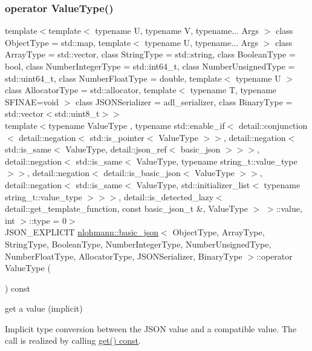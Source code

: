 \subsubsection{\texorpdfstring{operator Value\+Type()}{operator ValueType()}}
{\footnotesize\ttfamily template$<$template$<$ typename U, typename V, typename... Args $>$ class Object\+Type = std\+::map, template$<$ typename U, typename... Args $>$ class Array\+Type = std\+::vector, class String\+Type  = std\+::string, class Boolean\+Type  = bool, class Number\+Integer\+Type  = std\+::int64\+\_\+t, class Number\+Unsigned\+Type  = std\+::uint64\+\_\+t, class Number\+Float\+Type  = double, template$<$ typename U $>$ class Allocator\+Type = std\+::allocator, template$<$ typename T, typename S\+F\+I\+N\+A\+E=void $>$ class J\+S\+O\+N\+Serializer = adl\+\_\+serializer, class Binary\+Type  = std\+::vector$<$std\+::uint8\+\_\+t$>$$>$ \\
template$<$typename Value\+Type , typename std\+::enable\+\_\+if$<$ detail\+::conjunction$<$ detail\+::negation$<$ std\+::is\+\_\+pointer$<$ Value\+Type $>$$>$, detail\+::negation$<$ std\+::is\+\_\+same$<$ Value\+Type, detail\+::json\+\_\+ref$<$ basic\+\_\+json $>$$>$$>$, detail\+::negation$<$ std\+::is\+\_\+same$<$ Value\+Type, typename string\+\_\+t\+::value\+\_\+type $>$$>$, detail\+::negation$<$ detail\+::is\+\_\+basic\+\_\+json$<$ Value\+Type $>$$>$, detail\+::negation$<$ std\+::is\+\_\+same$<$ Value\+Type, std\+::initializer\+\_\+list$<$ typename string\+\_\+t\+::value\+\_\+type $>$$>$$>$, detail\+::is\+\_\+detected\+\_\+lazy$<$ detail\+::get\+\_\+template\+\_\+function, const basic\+\_\+json\+\_\+t \&, Value\+Type $>$ $>$\+::value, int $>$\+::type  = 0$>$ \\
J\+S\+O\+N\+\_\+\+E\+X\+P\+L\+I\+C\+IT \hyperlink{classnlohmann_1_1basic__json}{nlohmann\+::basic\+\_\+json}$<$ Object\+Type, Array\+Type, String\+Type, Boolean\+Type, Number\+Integer\+Type, Number\+Unsigned\+Type, Number\+Float\+Type, Allocator\+Type, J\+S\+O\+N\+Serializer, Binary\+Type $>$\+::operator Value\+Type (\begin{DoxyParamCaption}{ }\end{DoxyParamCaption}) const\hspace{0.3cm}{\ttfamily [inline]}}



get a value (implicit) 

Implicit type conversion between the J\+S\+ON value and a compatible value. The call is realized by calling \hyperlink{classnlohmann_1_1basic__json_ad8c8d2d107c6952960ba8aa78e009284}{get() const}.


